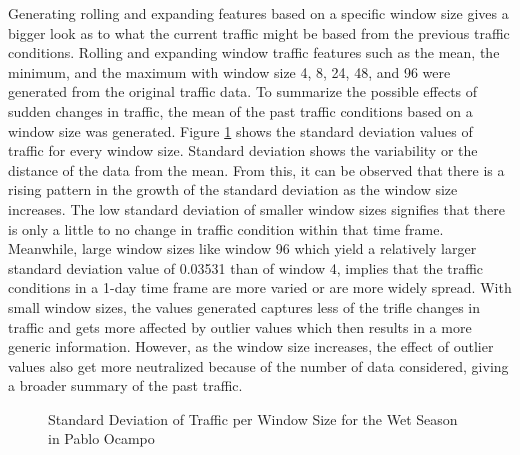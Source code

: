 Generating rolling and expanding features based on a specific window size gives a bigger look as to what the current traffic might be based from the previous traffic conditions. Rolling and expanding window traffic features such as the mean, the minimum, and the maximum with window size  4, 8, 24, 48, and 96 were generated from the original traffic data. To summarize the possible effects of sudden changes in traffic, the mean of the past traffic conditions based on a window size was generated. Figure \ref{stDev} shows the standard deviation values of traffic for every window size. Standard deviation shows the variability or the distance of the data from the mean. From this, it can be observed that there is a rising pattern in the growth of the standard deviation as the window size increases. The low standard deviation of smaller window sizes signifies that there is only a little to no change in traffic condition within that time frame. Meanwhile, large window sizes like window 96 which yield a relatively larger standard deviation value of 0.03531 than of window 4, implies that the traffic conditions in a 1-day time frame are more varied or are more widely spread. With small window sizes, the values generated captures less of the trifle changes in traffic and gets more affected by outlier values which then results in a more generic information. However, as the window size increases, the effect of outlier values also get more neutralized because of the number of data considered, giving a broader summary of the past traffic. 

\begin{figure}[!t] 
\centering
  \centering
  \caption{Standard Deviation of Traffic per Window Size for the Wet Season in Pablo Ocampo}
  \label{stDev}
\end{figure}

